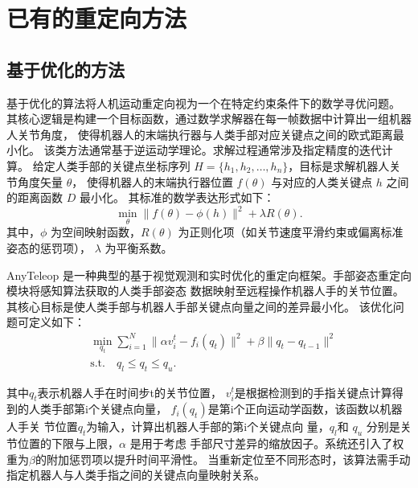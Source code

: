 \section{已有的重定向方法}
\subsection{基于优化的方法}
基于优化的算法将人机运动重定向视为一个在特定约束条件下的数学寻优问题。
其核心逻辑是构建一个目标函数，通过数学求解器在每一帧数据中计算出一组机器人关节角度，
使得机器人的末端执行器与人类手部对应关键点之间的欧式距离最小化。
该类方法通常基于逆运动学理论。求解过程通常涉及指定精度的迭代计算。
给定人类手部的关键点坐标序列 $H = \{h_1, h_2, \dots, h_n\}$，目标是求解机器人关节角度矢量 $\theta$，
使得机器人的末端执行器位置 $f(\theta)$ 与对应的人类关键点 $h$ 之间的距离函数 $D$ 最小化\cite{asfour_human-like_2003}\cite{choi_towards_2019}。
其标准的数学表达形式如下：
$$\min_{\theta} \|f(\theta) - \phi(h)\|^2 + \lambda R(\theta).$$
其中，$\phi$ 为空间映射函数，$R(\theta)$ 为正则化项（如关节速度平滑约束或偏离标准姿态的惩罚项），
$\lambda$ 为平衡系数。

AnyTeleop 是一种典型的基于视觉观测和实时优化的重定向框架。手部姿态重定向模块将感知算法获取的人类手部姿态
数据映射至远程操作机器人手的关节位置。其核心目标是使人类手部与机器人手部关键点向量之间的差异最小化。
该优化问题可定义如下：
\begin{equation}
\begin{aligned}
& \min_{q_t} \sum_{i=1}^{N} \| \alpha v_i^t - f_i(q_t) \|^2 + \beta \| q_t - q_{t-1} \|^2 \\
& \text{s.t.} \quad q_l \leq q_t \leq q_u.
\end{aligned}
\end{equation}

其中$q_t$表示机器人手在时间步t的关节位置，
$v_i^t$是根据检测到的手指关键点计算得到的人类手部第i个关键点向量，
$f_i(q_t)$是第i个正向运动学函数，该函数以机器人手关
节位置$q_t$为输入，计算出机器人手部的第i个关键点向
量，$q_l$和 $q_u$ 分别是关节位置的下限与上限，$\alpha$ 是用于考虑
手部尺寸差异的缩放因子。系统还引入了权重为$\beta$的附加惩罚项以提升时间平滑性。
当重新定位至不同形态时，该算法需手动指定机器人与人类手指之间的关键点向量映射关系。

